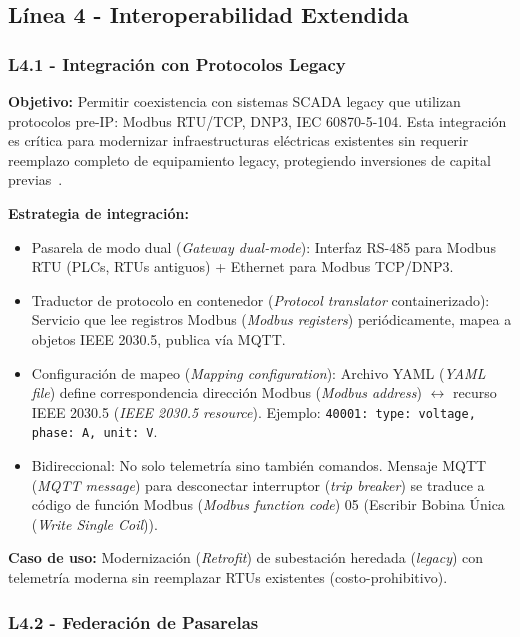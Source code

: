 \subsection{Línea 4 - Interoperabilidad Extendida}

\subsubsection{L4.1 - Integración con Protocolos Legacy}

\textbf{Objetivo:} Permitir coexistencia con sistemas SCADA legacy que utilizan protocolos pre-IP: Modbus RTU/TCP, DNP3, IEC 60870-5-104. Esta integración es crítica para modernizar infraestructuras eléctricas existentes sin requerir reemplazo completo de equipamiento legacy, protegiendo inversiones de capital previas~\cite{alsuwaidiSecuringSmartGrid2024}.

\textbf{Estrategia de integración:}
\begin{itemize}
\item Pasarela de modo dual (\textit{Gateway dual-mode}): Interfaz RS-485 para Modbus RTU (PLCs, RTUs antiguos) + Ethernet para Modbus TCP/DNP3.
\item Traductor de protocolo en contenedor (\textit{Protocol translator} containerizado): Servicio que lee registros Modbus (\textit{Modbus registers}) periódicamente, mapea a objetos IEEE 2030.5, publica vía MQTT.
\item Configuración de mapeo (\textit{Mapping configuration}): Archivo YAML (\textit{YAML file}) define correspondencia dirección Modbus (\textit{Modbus address}) $\leftrightarrow$ recurso IEEE 2030.5 (\textit{IEEE 2030.5 resource}). Ejemplo: \texttt{40001: {type: voltage, phase: A, unit: V}}.
\item Bidireccional: No solo telemetría sino también comandos. Mensaje MQTT (\textit{MQTT message}) para desconectar interruptor (\textit{trip breaker}) se traduce a código de función Modbus (\textit{Modbus function code}) 05 (Escribir Bobina Única (\textit{Write Single Coil})).
\end{itemize}

\textbf{Caso de uso:} Modernización (\textit{Retrofit}) de subestación heredada (\textit{legacy}) con telemetría moderna sin reemplazar RTUs existentes (costo-prohibitivo).

\subsubsection{L4.2 - Federación de Pasarelas}

